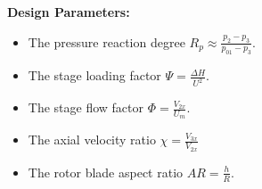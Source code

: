 \textbf{Design Parameters:}
\begin{itemize}
    \item The pressure reaction degree $R_p \approx \frac{p_2 - p_3}{p_{01} - p_3}$.
    \item The stage loading factor $\Psi = \frac{\Delta H}{U^2}$.
    \item The stage flow factor $\Phi = \frac{V_{2x}}{U_m}$.
    \item The axial velocity ratio $\chi = \frac{V_{3x}}{V_{2x}}$
    \item The rotor blade aspect ratio $AR = \frac{h}{R}$.
\end{itemize}
